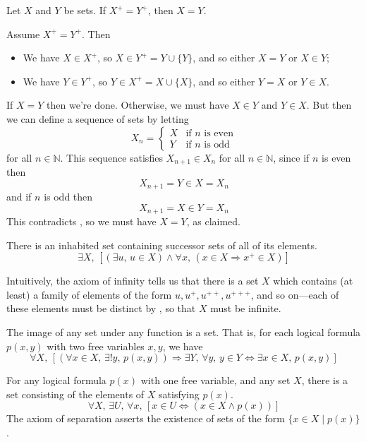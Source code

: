 \begin{lemma}
\label{lemSuccessorSetIsInjective}
Let $X$ and $Y$ be sets. If $X^+ = Y^+$, then $X=Y$.
\end{lemma}

\begin{cproof}
Assume $X^+=Y^+$. Then
\begin{itemize}
\item We have $X \in X^+$, so $X \in Y^+ = Y \cup \{ Y \}$, and so either $X = Y$ or $X \in Y$;
\item We have $Y \in Y^+$, so $Y \in X^+ = X \cup \{ X \}$, and so either $Y = X$ or $Y \in X$.
\end{itemize}
If $X=Y$ then we're done. Otherwise, we must have $X \in Y$ and $Y \in X$. But then we can define a sequence of sets by letting
\[ X_n = \begin{cases} X & \text{if } n \text{ is even} \\ Y & \text{if } n \text{ is odd} \end{cases} \]
for all $n \in \mathbb{N}$. This sequence satisfies $X_{n+1} \in X_n$ for all $n \in \mathbb{N}$, since if $n$ is even then
\[ X_{n+1} = Y \in X = X_n \]
and if $n$ is odd then
\[ X_{n+1} = X \in Y = X_n \]
This contradicts , so we must have $X=Y$, as claimed.
\end{cproof}

\begin{axiom}
\label{axZFCInfinity}
There is an inhabited set containing successor sets of all of its elements.
\[ \exists X,\, [(\exists u,\, u \in X) \wedge \forall x,\, (x \in X \Rightarrow x^+ \in X)] \]
\end{axiom}

Intuitively, the axiom of infinity tells us that there is a set $X$ which contains (at least) a family of elements of the form $u, u^+, u^{++}, u^{+++}$, and so on---each of these elements must be distinct by , so that $X$ must be infinite.

\begin{axiom}
\label{axZFCReplacement}
The image of any set under any function is a set. That is, for each logical formula $p(x,y)$ with two free variables $x,y$, we have
\[ \forall X,\, [(\forall x \in X,\, \exists ! y,\, p(x,y)) \Rightarrow \exists Y,\, \forall y,\, y \in Y \Leftrightarrow \exists x \in X,\, p(x,y)] \]
\end{axiom}

\begin{axiom}
\label{axZFCSeparation}
For any logical formula $p(x)$ with one free variable, and any set $X$, there is a set consisting of the elements of $X$ satisfying $p(x)$.
\[ \forall X,\, \exists U,\, \forall x,\, [x \in U \Leftrightarrow (x \in X \wedge p(x))] \]
The axiom of separation asserts the existence of sets of the form $\{ x \in X \mid p(x) \}$.
\end{axiom}

